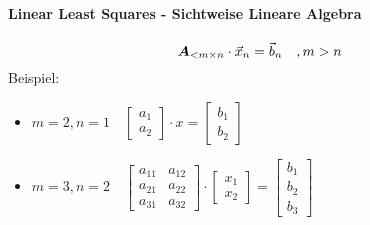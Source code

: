 \paragraph{Linear Least Squares - Sichtweise Lineare Algebra}
\begin{equation}
\boldsymbol {A}_{<m\times n}\cdot\vec{x}_{n} = \vec{b}_{n}\quad,m>n
\end{equation}
Beispiel:
\begin{itemize}
\item $m=2,n=1\quad\begin{bmatrix}
a_1 \\ a_2
\end{bmatrix}\cdot x = \begin{bmatrix}
b_1 \\ b_2
\end{bmatrix}$
\item $m=3,n=2\quad\begin{bmatrix}
a_{11} & a_{12} \\ a_{21} & a_{22} \\ a_{31} & a_{32}
\end{bmatrix}\cdot \begin{bmatrix}
x_1 \\ x_2
\end{bmatrix} = \begin{bmatrix}
b_1 \\ b_2 \\ b_3
\end{bmatrix}$
\end{itemize}

